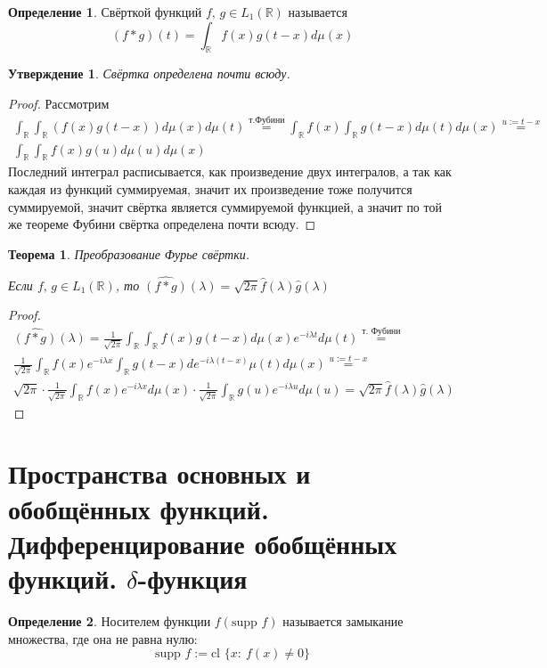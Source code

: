 \documentclass[a4paper,12pt]{article}
\theoremstyle{plain}
\newtheorem{theorem}{Теорема}[section]
\newtheorem{proposition}{Утверждение}[section]
\theoremstyle{definition}
\newtheorem{definition}{Определение}[section]
\theoremstyle{remark}
\begin{document}
\begin{definition}
	Свёрткой функций $f,\, g \in L_1(\mathbb{R})$ называется
	\[(f * g)(t) = \int_\mathbb{R}f(x)g(t - x)d\mu(x)\]
\end{definition}

\begin{proposition}
	Свёртка определена почти всюду.
\end{proposition}
\begin{proof}
	Рассмотрим
	\begin{align*}
		\int_\mathbb{R}\int_\mathbb{R} (f(x)g(t - x))d\mu(x)d\mu(t) \stackrel{\text{т.Фубини}}{=} \int_\mathbb{R}f(x)\int_\mathbb{R}g(t - x)d\mu(t)d\mu(x) \stackrel{u := t - x}{=} \\
		\int_\mathbb{R}\int_\mathbb{R} f(x)g(u)d\mu(u)d\mu(x)
	\end{align*}
	Последний интеграл расписывается, как произведение двух интегралов, а так как каждая из функций суммируемая, значит их произведение тоже получится суммируемой, значит свёртка является суммируемой функцией, а значит по той же теореме Фубини свёртка определена почти всюду.
\end{proof}

\begin{theorem}
	Преобразование Фурье свёртки.

	Если $f,\,g \in L_1(\mathbb{R})$, то $\widehat{(f * g)}(\lambda) = \sqrt{2\pi}\hat{f}(\lambda)\hat{g}(\lambda)$
\end{theorem}
\begin{proof}
	\begin{align*}
		\widehat{(f * g)}(\lambda) = \frac{1}{\sqrt{2\pi}}\int_\mathbb{R}\int_\mathbb{R} f(x)g(t - x)d\mu(x)e^{-i\lambda t}d\mu(t) \stackrel{\text{т. Фубини}}{=} \\
		\frac{1}{\sqrt{2\pi}}\int_\mathbb{R}f(x) e^{-i\lambda x}\int_\mathbb{R}g(t - x)d e^{-i\lambda (t - x)}\mu(t)d\mu(x) \stackrel{u := t - x}{=}              \\
		\sqrt{2\pi}\cdot\frac{1}{\sqrt{2\pi}}\int_\mathbb{R}f(x) e^{-i\lambda x} d\mu(x) \cdot \frac{1}{\sqrt{2\pi}}\int_\mathbb{R}g(u) e^{-i\lambda u} d\mu(u) = \sqrt{2\pi}\hat{f}(\lambda)\hat{g}(\lambda)
	\end{align*}
\end{proof}

\section{Пространства основных и обобщённых функций. Дифференцирование обобщённых функций. $\delta$-функция}
\begin{definition}
	Носителем функции $f (\text{supp }f)$ называется замыкание множества, где она не равна нулю:
	\[\text{supp }f := \text{cl }\{x:\: f(x) \neq 0\}\]
\end{definition}
\end{document}
